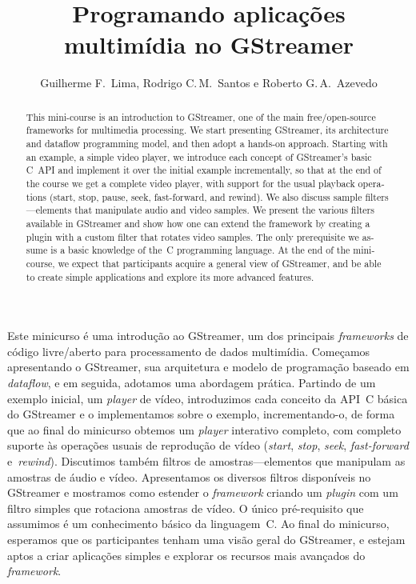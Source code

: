 \documentclass{SBCbookchapter}
\title{Programando aplicações multimídia no GStreamer}
\author{Guilherme F.~Lima, Rodrigo C.\,M.~Santos e Roberto G.\,A.~Azevedo}
\begin{document}
\maketitle
\begin{abstract}
\begin{otherlanguage}{english}
This mini-course is an introduction to GStreamer, one of the main
free/open-source frameworks for multimedia processing.  We start presenting
GStreamer, its architecture and dataflow programming model, and then adopt a
hands-on approach.  Starting with an example, a simple video player, we
introduce each concept of GStreamer's basic C~API and implement it over the
initial example incrementally, so that at the end of the course we get a
complete video player, with support for the usual playback operations
(start, stop, pause, seek, fast-forward, and rewind).  We also discuss
sample filters---elements that manipulate audio and video samples.  We
present the various filters available in GStreamer and show how one can
extend the framework by creating a plugin with a custom filter that rotates
video samples.  The only prerequisite we assume is a basic knowledge of
the~C programming language.  At the end of the mini-course, we expect that
participants acquire a general view of GStreamer, and be able to create
simple applications and explore its more advanced features.
\end{otherlanguage}
\end{abstract}

\begin{resumo}
Este minicurso é uma introdução ao GStreamer, um dos principais
\emph{frameworks} de código livre/aberto para processamento de dados
multimídia.  Começamos apresentando o GStreamer, sua arquitetura e modelo de
programação baseado em \emph{dataflow}, e em seguida, adotamos uma abordagem
prática.  Partindo de um exemplo inicial, um \emph{player} de vídeo,
introduzimos cada conceito da API~C básica do GStreamer e o implementamos
sobre o exemplo, incrementando-o, de forma que ao final do minicurso obtemos
um \emph{player} interativo completo, com completo suporte às operações
usuais de reprodução de vídeo (\emph{start}, \emph{stop}, \emph{seek},
\emph{fast-forward} e~\emph{rewind}).  Discutimos também filtros de
amostras---elementos que manipulam as amostras de áudio e vídeo.
Apresentamos os diversos filtros disponíveis no GStreamer e mostramos como
estender o \emph{framework} criando um \emph{plugin} com um filtro simples
que rotaciona amostras de vídeo.  O único pré-requisito que assumimos é um
conhecimento básico da linguagem~C.  Ao final do minicurso, esperamos que os
participantes tenham uma visão geral do GStreamer, e estejam aptos a criar
aplicações simples e explorar os recursos mais avançados do
\emph{framework}.
\end{resumo}
\end{document}

